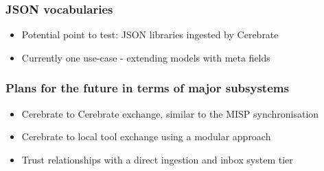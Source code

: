 \begin{frame}
	\frametitle{JSON vocabularies}
	\begin{itemize}
		\item Potential point to test: JSON libraries ingested by Cerebrate
                \item Currently one use-case - extending models with meta fields
	\end{itemize}
\end{frame}

\begin{frame}
	\frametitle{Plans for the future in terms of major subsystems}
	\begin{itemize}
		\item Cerebrate to Cerebrate exchange, similar to the MISP synchronisation
                \item Cerebrate to local tool exchange using a modular approach
                \item Trust relationships with a direct ingestion and inbox system tier
	\end{itemize}
\end{frame}

